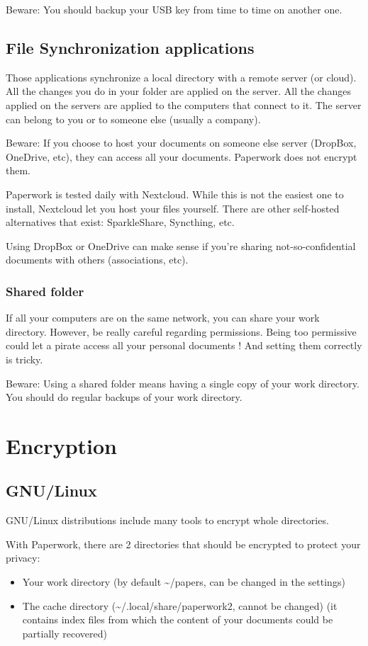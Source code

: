 \documentclass[10pt,a4paper]{article}
\begin{document}
Beware: You should backup your USB key from time to time on another one.


\subsection{File Synchronization applications}

Those applications synchronize a local directory with a remote server
(or cloud). All the changes you do in your folder are applied on the
server. All the changes applied on the servers are applied to the
computers that connect to it. The server can belong to you or to someone
else (usually a company).

Beware: If you choose to host your documents on someone else server
(DropBox, OneDrive, etc), they can access all your documents. Paperwork
does not encrypt them.

Paperwork is tested daily with Nextcloud. While this is not the easiest one to
install, Nextcloud let you host your files yourself. There are other
self-hosted alternatives that exist: SparkleShare, Syncthing, etc.

Using DropBox or OneDrive can make sense if you're sharing not-so-confidential
documents with others (associations, etc).


\subsubsection{Shared folder}

If all your computers are on the same network, you can share your
work directory. However, be really careful regarding permissions.
Being too permissive could let a pirate access all your personal documents
! And setting them correctly is tricky.

Beware: Using a shared folder means having a single copy of your work
directory. You should do regular backups of your work directory.


\section{Encryption}

\subsection{GNU/Linux}

GNU/Linux distributions include many tools to encrypt whole directories.

With Paperwork, there are 2 directories that should be encrypted to
protect your privacy:
\begin{itemize}
	\item Your work directory (by default \textasciitilde /papers, can be
		changed in the settings)
	\item The cache directory (\textasciitilde /.local/share/paperwork2,
		cannot be changed) (it contains index files from which the
		content of your documents could be partially recovered)
\end{itemize}
\end{document}
